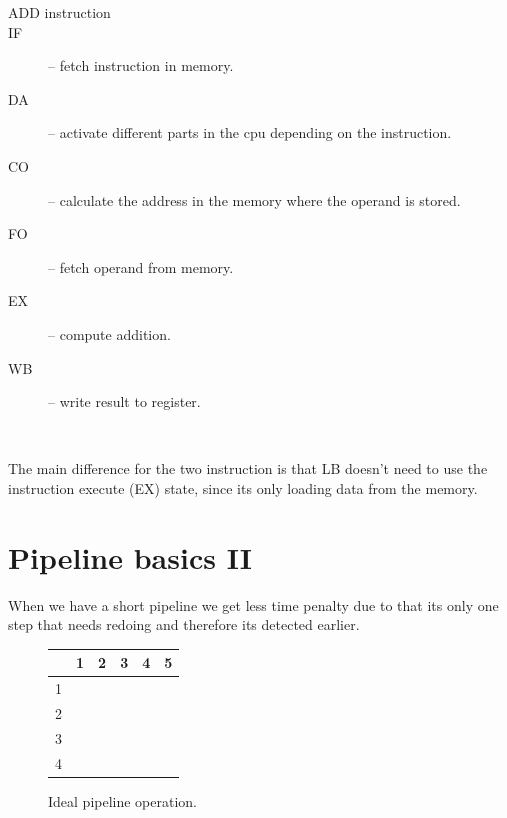 \documentclass[titlepage, a4paper]{article}
\begin{document}
\begin{description}
\item[ADD instruction]
\item[IF] -- fetch instruction in memory.
\item[DA] -- activate different parts in the cpu depending on the instruction.
\item[CO] -- calculate the address in the memory where the operand is stored. 
\item[FO] -- fetch operand from memory.
\item[EX] -- compute addition.
\item[WB] -- write result to register.
\end{description}
~\newline

The main difference for the two instruction is that LB doesn't need to use the instruction execute (EX) state, since its only loading data from the memory.

\section{Pipeline basics II}
When we have a short pipeline we get less time penalty due to that its only one step that needs redoing and therefore its detected earlier. \\

\begin{figure}[H]
  \centering
  \begin{tabular}{|c|c|c|c|c|c|}
    \hline
        {} & {1} & {2} & {3} & {4} & {5} \\ \hline
        {1} & \cellcolor{blue!25}{IF} & \cellcolor{orange!25}{EX} & {} & {} & {} \\ \hline
        {2} & {} & \cellcolor{blue!25}{IF} & \cellcolor{orange!25}{EX} & {} & {} \\ \hline
        {3} & {} & {} & \cellcolor{blue!25}{IF} & \cellcolor{orange!25}{EX} & {} \\ \hline
        {4} & {} & {} & {} & \cellcolor{blue!25}{IF} & \cellcolor{orange!25}{EX} \\ \hline
  \end{tabular}
  \caption{Ideal pipeline operation.}
  \label{fig:ideal_pipe_op}
\end{figure}
\end{document}

